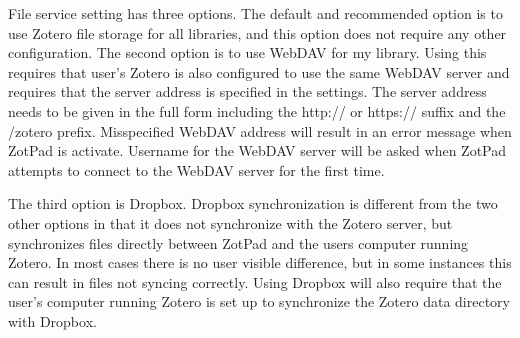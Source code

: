 \documentclass[oneside, openany, 12pt]{tufte-book}
\newcommand{\ipadfootnote}[1]{}
\newcommand{\ipadfootnote}[1]{\footnote{#1}}
\begin{document}
File service setting has three options. The default and recommended option is to use Zotero file storage for all libraries, and this option does not require any other configuration. The second option is to use WebDAV for my library. Using this requires that user's Zotero is also configured to use the same WebDAV server and requires that the server address is specified in the settings. The server address needs to be given in the full form including the http:// or https:// suffix and the /zotero prefix. Misspecified WebDAV address will result in an error message when ZotPad is activate. Username for the WebDAV server will be asked when ZotPad attempts to connect to the WebDAV server for the first time.

The third option is Dropbox. Dropbox synchronization is different from the two other options in that it does not synchronize with the Zotero server, but synchronizes files directly between ZotPad and the users computer running Zotero. In most cases there is no user visible difference, but in some instances this can result in files not syncing correctly\ipadfootnote{For example, if a user edits a file on his/her computer, but does not sync Zotero, ZotPad does not know that a new version of a file would be available in Dropbox because Zotero server is not aware of this change.}. Using Dropbox will also require that the user's computer running Zotero is set up to synchronize the Zotero data directory with Dropbox.
\end{document}
